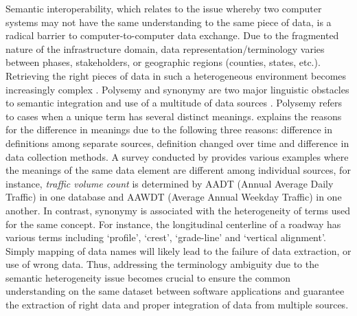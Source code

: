 \documentclass[Journal,InsideFigs, DoubleSpace]{ascelike} %
\begin{document}
%
\par
Semantic interoperability, which relates to the issue whereby two computer systems may not have the same understanding to the same piece of data, is a radical barrier to computer-to-computer data exchange. Due to the fragmented nature of the infrastructure domain, data representation/terminology varies between phases, stakeholders, or geographic regions (counties, states, etc.). Retrieving the right pieces of data in such a heterogeneous environment becomes increasingly complex \cite{karimi2003semantic}. Polysemy and synonymy are two major linguistic obstacles to semantic integration and use of a multitude of data sources \cite{noy04}. Polysemy refers to cases when a unique term has several distinct meanings. \cite{walton15} explains the reasons for the difference in meanings due to the following three reasons: difference in definitions among separate sources, definition changed over time and difference in data collection methods. A survey conducted by\cite{walton15} provides various examples where the meanings of the same data element are different among individual sources, for instance, \textit{traffic volume count} is determined by AADT (Annual Average Daily Traffic) in one database and AAWDT (Average Annual Weekday Traffic) in one another. In contrast, synonymy is associated with the heterogeneity of terms used for the same concept. For instance, the longitudinal centerline of a roadway has various terms including `profile', `crest', `grade-line' and `vertical alignment'. Simply mapping of data names will likely lead to the failure of data extraction, or use of wrong data. Thus, addressing the terminology ambiguity due to the semantic heterogeneity issue becomes crucial to ensure the common understanding on the same dataset between software applications and guarantee the extraction of right data and proper integration of data from multiple sources. 
\par
\end{document}

